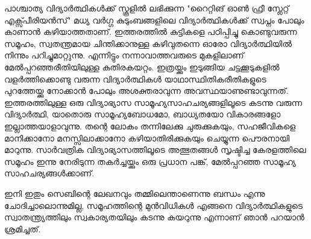 പാശ്ചാത്യ വിദ്യാര്‍ത്ഥികള്‍ക്ക് സ്കൂളില്‍ ലഭിക്കുന്ന "റൈറ്റിങ് ഓണ്‍ ഫ്രീ സ്ലേറ്റ് എക്സ്പീരിയന്‍സ്" മധ്യ വര്‍ഗ്ഗ കുടുംബങ്ങളിലെ വിദ്യാര്‍ത്ഥികള്‍ക്ക് സ്വപ്നം പോലും കാണാന്‍ കഴിയാത്തതാണ്. ഇത്തരത്തില്‍ കുട്ടികളെ പഠിപ്പിച്ചു കൊണ്ടുവരുന്ന സമൂഹം, സ്വതന്ത്രമായ ചിന്തിക്കാനുള്ള കഴിവുതന്നെ ഓരോ വിദ്യാര്‍ത്ഥിയില്‍ നിന്നും പറിച്ചുമാറ്റുന്നു. എന്നിട്ടും നന്നാവാത്തവരുടെ മുകളിലാണ് മേല്‍പ്പറഞ്ഞരീതിയിലുള്ള കുതിരകയറ്റം. ഇത്രയ്ക്കും ഇടുങ്ങിയ ചട്ടക്കൂടുകളില്‍ വളര്‍ത്തിക്കൊണ്ടു വരുന്ന വിദ്യാര്‍ത്ഥികള്‍ യാഥാസ്ഥിതികരീതികളുടെ പുറത്തേയ്ക്കു നോക്കാന്‍ പോലും അശക്തരാവുന്ന അവസ്ഥയാണുണ്ടാവുന്നത്. ഇത്തരത്തിലുള്ള ഒരു വിദ്യാഭ്യാസ സാമൂഹ്യസാഹചര്യങ്ങളിലൂടെ കടന്നു വരുന്ന വിദ്യാര്‍ത്ഥി, യാതൊരു സാമൂഹ്യബോധമോ, ബാധ്യതയോ വികാരങ്ങളോ ഇല്ലാത്തയാളാവുന്നു. തന്റെ ലോകം തന്നിലേക്കു ചുരുക്കുകയും, സഹജീവികളെ മാനിക്കാനോ മനസ്സിലാക്കാനോ കഴിയാതിരിക്കുകയും ചെയ്യുന്ന പൌരനായി മാറുന്നു. സാര്‍വത്രിക വിദ്യാഭ്യാസത്തിലൂടെ അത്ഭുതങ്ങള്‍ സൃഷ്ടിച്ച കേരളത്തിലെ സമൂഹം ഇന്നു നേരിടുന്ന തകര്‍ച്ചയ്ക്കും ഒരു പ്രധാന പങ്ക്, മേല്‍പ്പറഞ്ഞ സാമൂഹ്യ സാഹചര്യങ്ങള്‍ക്കാണ്.

ഇനി ഇതും സെബിന്റെ ലേഖനവും തമ്മിലെന്താണെന്നു ബന്ധം എന്നു ചോദിച്ചാലൊന്നുമില്ല, സമൂഹത്തിന്റെ മുന്‍വിധികള്‍ എങ്ങനെ വിദ്യാര്‍ത്ഥികളുടെ സ്വാതന്ത്ര്യത്തിലും സ്വകാര്യതയിലും കടന്നു കയറുന്നു എന്നാണ് ഞാന്‍ പറയാന്‍ ശ്രമിച്ചത്.

\newpage
